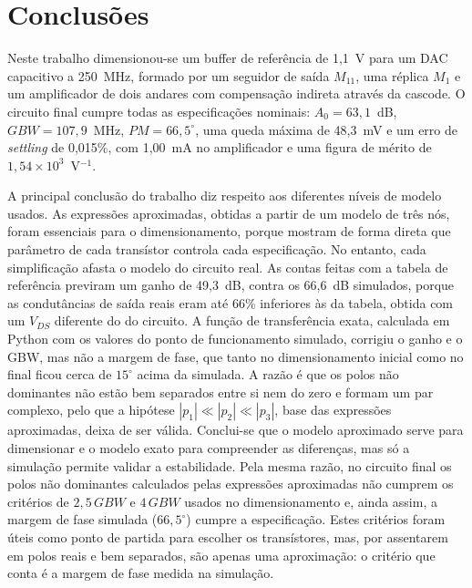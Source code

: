 \section{Conclusões}
\label{sec:conclusoes}

Neste trabalho dimensionou-se um buffer de referência de 1,1~V para um DAC capacitivo a 250~MHz, formado por um seguidor
de saída $M_{11}$, uma réplica $M_1$ e um amplificador de dois andares com compensação indireta através da cascode. O
circuito final cumpre todas as especificações nominais: $A_0 = 63{,}1$~dB, $GBW = 107{,}9$~MHz, $PM = 66{,}5^\circ$, uma
queda máxima de 48,3~mV e um erro de \textit{settling} de 0,015\%, com 1,00~mA no amplificador e uma figura de mérito de
$1{,}54\times10^3$~V$^{-1}$.

A principal conclusão do trabalho diz respeito aos diferentes níveis de modelo usados. As expressões aproximadas,
obtidas a partir de um modelo de três nós, foram essenciais para o dimensionamento, porque mostram de forma direta que
parâmetro de cada transístor controla cada especificação. No entanto, cada simplificação afasta o modelo do circuito
real. As contas feitas com a tabela de referência previram um ganho de 49,3~dB, contra os 66,6~dB simulados, porque as
condutâncias de saída reais eram até 66\% inferiores às da tabela, obtida com um $V_{DS}$ diferente do do circuito. A
função de transferência exata, calculada em Python com os valores do ponto de funcionamento simulado, corrigiu o ganho e o
GBW, mas não a margem de fase, que tanto no dimensionamento inicial como no final ficou cerca de $15^\circ$ acima da
simulada. A razão é que os polos não dominantes não estão bem separados entre si nem do zero e formam um par complexo, pelo
que a hipótese $|p_1| \ll |p_2| \ll |p_3|$, base das expressões aproximadas, deixa de ser válida. Conclui-se que o modelo
aproximado serve para dimensionar e o modelo exato para compreender as diferenças, mas só a simulação permite validar a
estabilidade.
Pela mesma razão, no circuito final os polos não dominantes calculados pelas expressões aproximadas não
cumprem os critérios de $2{,}5\,GBW$ e $4\,GBW$ usados no dimensionamento e, ainda assim, a margem de fase simulada
($66{,}5^\circ$) cumpre a especificação. Estes critérios foram úteis como ponto de partida para escolher os transístores,
mas, por assentarem em polos reais e bem separados, são apenas uma aproximação: o critério que conta é a margem de fase
medida na simulação.

